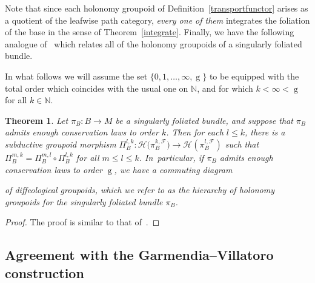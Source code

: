 \documentclass[10pt,a4paper]{amsart}
\numberwithin{equation}{section}
\newtheorem{Theorem}{Theorem}[section]
\def\g{\operatorname{g}}
\def\FF{{\mathcal{F}}}
\def\HH{{\mathcal{H}}}
\def\NB{{\mathbb{N}}}
\begin{document}
Note that since each holonomy groupoid of Definition~\ref{transportfunctor} arises as a quotient of the leafwise path category, \textit{every one of them} integrates the foliation of the base in the sense of Theorem~\ref{integrate}. Finally, we have the following analogue of~\cite[Theorem~5.15]{mac3} which relates all of the holonomy groupoids of a singularly foliated bundle.

In what follows we will assume the set $\{0,1,\dots,\infty,\g\}$ to be equipped with the total order which coincides with the usual one on $\NB$, and for which $k<\infty<\g$ for all $k\in\NB$.

\begin{Theorem}\label{hierarchy}
Let $\pi_{B}\colon B\rightarrow M$ be a singularly foliated bundle, and suppose that $\pi_{B}$ admits enough conservation laws to order $k$. Then for each $l\leq k$, there is a subductive groupoid morphism $\Pi_{B}^{l,k}\colon \HH\big(\pi_{B}^{k,\FF}\big)\rightarrow\HH(\pi_{B}^{l,\FF})$ such that $\Pi_{B}^{m,k} = \Pi_{B}^{m,l}\circ\Pi_{B}^{l,k}$ for all $m\leq l\leq k$. In~particular, if $\pi_{B}$ admits enough conservation laws to order $\g$, we have a commuting diagram
\begin{center}
\end{center}
of diffeological groupoids, which we refer to as the \textit{hierarchy of holonomy groupoids} for the singularly foliated bundle $\pi_{B}$.
\end{Theorem}

\begin{proof}
The proof is similar to that of~\cite[Theorem~5.15]{mac3}.
\end{proof}

\subsection{Agreement with the Garmendia--Villatoro construction}
\end{document}
